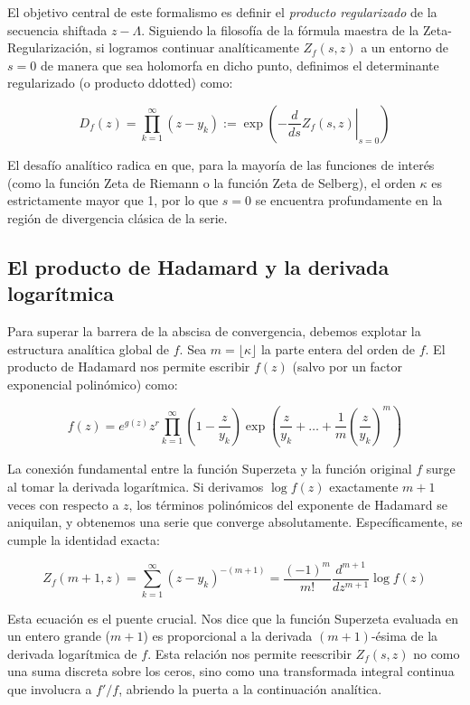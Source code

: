 El objetivo central de este formalismo es definir el \textit{producto regularizado} de la secuencia shiftada $z - \Lambda$. Siguiendo la filosofía de la fórmula maestra de la Zeta-Regularización, si logramos continuar analíticamente $Z_f(s, z)$ a un entorno de $s=0$ de manera que sea holomorfa en dicho punto, definimos el determinante regularizado (o producto ddotted) como:

$$ D_f(z) = \prod_{k=1}^{\infty} (z - y_k) := \exp\left( -\left. \frac{d}{ds} Z_f(s, z) \right|_{s=0} \right) $$

El desafío analítico radica en que, para la mayoría de las funciones de interés (como la función Zeta de Riemann o la función Zeta de Selberg), el orden $\kappa$ es estrictamente mayor que 1, por lo que $s=0$ se encuentra profundamente en la región de divergencia clásica de la serie.

\subsection{El producto de Hadamard y la derivada logarítmica}

Para superar la barrera de la abscisa de convergencia, debemos explotar la estructura analítica global de $f$. Sea $m = \lfloor \kappa \rfloor$ la parte entera del orden de $f$. El producto de Hadamard nos permite escribir $f(z)$ (salvo por un factor exponencial polinómico) como:

$$ f(z) = e^{g(z)} z^r \prod_{k=1}^{\infty} \left(1 - \frac{z}{y_k}\right) \exp\left( \frac{z}{y_k} + \dots + \frac{1}{m}\left(\frac{z}{y_k}\right)^m \right) $$

La conexión fundamental entre la función Superzeta y la función original $f$ surge al tomar la derivada logarítmica. Si derivamos $\log f(z)$ exactamente $m+1$ veces con respecto a $z$, los términos polinómicos del exponente de Hadamard se aniquilan, y obtenemos una serie que converge absolutamente. Específicamente, se cumple la identidad exacta:

$$ Z_f(m+1, z) = \sum_{k=1}^{\infty} (z - y_k)^{-(m+1)} = \frac{(-1)^m}{m!} \frac{d^{m+1}}{dz^{m+1}} \log f(z) $$

Esta ecuación es el puente crucial. Nos dice que la función Superzeta evaluada en un entero grande ($m+1$) es proporcional a la derivada $(m+1)$-ésima de la derivada logarítmica de $f$. Esta relación nos permite reescribir $Z_f(s, z)$ no como una suma discreta sobre los ceros, sino como una transformada integral continua que involucra a $f'/f$, abriendo la puerta a la continuación analítica.


